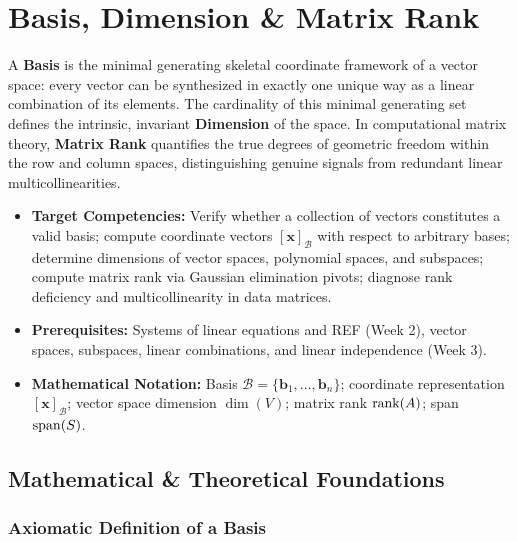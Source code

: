 \chapter{Basis, Dimension \& Matrix Rank}

A \textbf{Basis} is the minimal generating skeletal coordinate framework of a vector space: every vector can be synthesized in exactly one unique way as a linear combination of its elements. The cardinality of this minimal generating set defines the intrinsic, invariant \textbf{Dimension} of the space. In computational matrix theory, \textbf{Matrix Rank} quantifies the true degrees of geometric freedom within the row and column spaces, distinguishing genuine signals from redundant linear multicollinearities.

\vspace{0.5cm}
\begin{tcolorbox}[colback=primarylight, colframe=primarydark, title={\textbf{Executive Roadmap \& Learning Objectives}}]
\begin{itemize}
    \item \textbf{Target Competencies:} Verify whether a collection of vectors constitutes a valid basis; compute coordinate vectors $[\mathbf{x}]_\mathcal{B}$ with respect to arbitrary bases; determine dimensions of vector spaces, polynomial spaces, and subspaces; compute matrix rank via Gaussian elimination pivots; diagnose rank deficiency and multicollinearity in data matrices.
    \item \textbf{Prerequisites:} Systems of linear equations and REF (Week 2), vector spaces, subspaces, linear combinations, and linear independence (Week 3).
    \item \textbf{Mathematical Notation:} Basis $\mathcal{B} = \{\mathbf{b}_1, \dots, \mathbf{b}_n\}$; coordinate representation $[\mathbf{x}]_\mathcal{B}$; vector space dimension $\dim(V)$; matrix rank $\operatorname{rank}(A)$; span $\operatorname{span}(S)$.
\end{itemize}
\end{tcolorbox}

\section{Mathematical \& Theoretical Foundations}

\subsection{Axiomatic Definition of a Basis}

